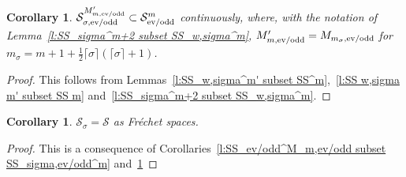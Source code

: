 \documentclass[11pt]{article}
\newtheorem{Corollary}[Theorem]{Corollary}
\renewcommand{\SS}{\mathcal{S}}
\begin{document}
\begin{Corollary}\label{c:SS_sigma^m' subset SS^m}
  $\SS_{\sigma,\text{\rm ev/odd}}^{M'_{m,\text{\rm ev/odd}}}\subset\SS_{\text{\rm ev/odd}}^m$ continuously, where, with the notation of Lemma~{\rm \ref{l:SS_sigma^m+2 subset SS_w,sigma^m}}, $M'_{m,\text{\rm ev/odd}}=M_{m_\sigma,\text{\rm ev/odd}}$ for $m_\sigma=m+1+\frac{1}{2}\lceil\sigma\rceil(\lceil\sigma\rceil+1)$.
\end{Corollary}

\begin{proof}
  This follows from Lemmas~\ref{l:SS_w,sigma^m' subset SS^m},~\ref{l:SS w,sigma m' subset SS m} and~\ref{l:SS_sigma^m+2 subset SS_w,sigma^m}.
\end{proof}

\begin{Corollary}\label{c:SS_sigma = SS}
  $\SS_\sigma=\SS$ as Fr\'echet spaces.
\end{Corollary}

\begin{proof}
  This is a consequence of Corollaries~\ref{l:SS_ev/odd^M_m,ev/odd subset SS_sigma,ev/odd^m} and~\ref{c:SS_sigma^m' subset SS^m}
\end{proof}
\end{document}
